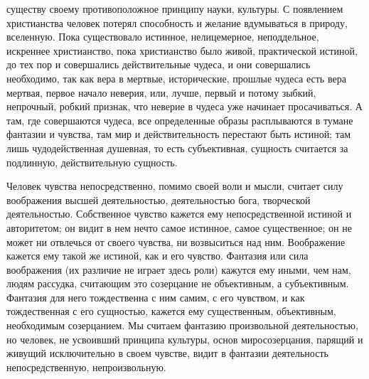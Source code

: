 \documentclass[12pt,oneside]{book}
\begin{document}
существу своему противоположное принципу науки, культуры\dag\let\svthefootnote\thefootnote\let\thefootnote\relax{}\let\thefootnote\svthefootnote. С появлением христианства человек потерял способность и желание вдумываться в природу, вселенную. Пока существовало истинное, нелицемерное, неподдельное, искреннее христианство, пока христианство было живой, практической истиной, до тех пор и совершались действительные чудеса, и они совершались необходимо, так как вера в мертвые, исторические, прошлые чудеса есть вера мертвая, первое начало неверия, или, лучше, первый и потому зыбкий, непрочный, робкий признак, что неверие в чудеса уже начинает просачиваться. А там, где совершаются чудеса, все определенные образы расплываются в тумане фантазии и чувства, там мир и действительность перестают быть истиной; там лишь чудодейственная душевная, то есть субъективная, сущность считается за подлинную, действительную сущность.






Человек чувства непосредственно, помимо своей воли и мысли, считает силу воображения высшей деятельностью, деятельностью бога, творческой деятельностью. Собственное чувство кажется ему непосредственной истиной и авторитетом; он видит в нем нечто самое истинное, самое существенное; он не может ни отвлечься от своего чувства, ни возвыситься над ним. Воображение кажется ему такой же истиной, как и его чувство. Фантазия или сила воображения (их различие не играет здесь роли) кажутся ему иными, чем нам, людям рассудка, считающим это созерцание не объективным, а субъективным. Фантазия для него тождественна с ним самим, с его чувством, и как тождественная с его сущностью, кажется ему существенным, объективным, необходимым созерцанием. Мы считаем фантазию произвольной деятельностью, но человек, не усвоивший принципа культуры, основ миросозерцания, парящий и живущий исключительно в своем чувстве, видит в фантазии деятельность непосредственную, непроизвольную.
\end{document}
